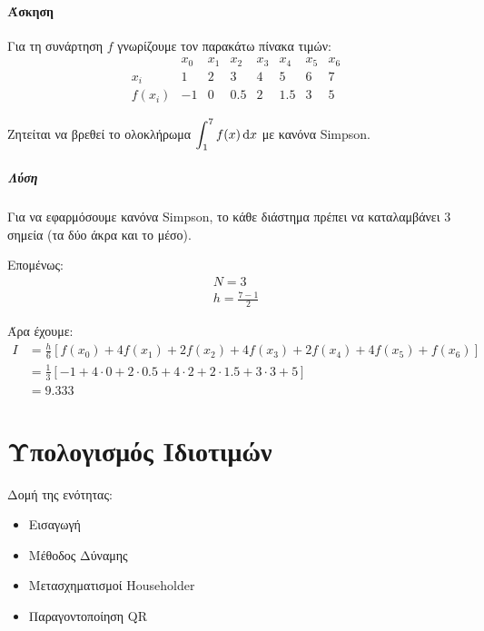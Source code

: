 \documentclass[11pt,a4paper,notitlepage,fleqn]{article}
\begin{document}
    \paragraph{Άσκηση}
    Για τη συνάρτηση \( f \) γνωρίζουμε τον παρακάτω πίνακα τιμών:
    \[
    \begin{array}{r|c|c|c|c|c|c|c}
    	       & x_0 & x_1 & x_2 & x_3 & x_4 & x_5 & x_6 \\[2ex]
    	   x_i &  1  &  2  &  3  &  4  &  5  &  6  &  7  \\ \hline
    	f(x_i) & -1  &  0  & 0.5 &  2  & 1.5 &  3  &  5
    \end{array}
    \]
    
    Ζητείται να βρεθεί το ολοκλήρωμα \( \displaystyle \int_1^7 f(x) 
    \mathop{}\!\mathrm{d} x \) με κανόνα Simpson.
    
    \subparagraph{Λύση}
    Για να εφαρμόσουμε κανόνα Simpson, το κάθε διάστημα πρέπει να
    καταλαμβάνει 3 σημεία (τα δύο άκρα και το μέσο).

    
    Επομένως:
    \begin{gather*}
    	N = 3 \\
    	h=\frac{7-1}{2}
    \end{gather*}
    
    Άρα έχουμε:
    \begin{align*}
    	I &= \frac{h}{6} \left[
    	f(x_0)+4f(x_1)+2f(x_2)+4f(x_3)+2f(x_4)+4f(x_5)+f(x_6)
    	\right] \\ &= \frac{1}{3} \left[
    	-1+4\cdot 0 + 2\cdot 0.5 + 4\cdot 2 + 2\cdot 1.5 + 3\cdot 3+5
    	\right] \\ &= 9.333
    \end{align*}
    
    \section{Υπολογισμός Ιδιοτιμών}
    Δομή της ενότητας:
    \begin{itemize}
    	\item Εισαγωγή
    	\item Μέθοδος Δύναμης
    	\item Μετασχηματισμοί Householder
    	\item Παραγοντοποίηση QR
    \end{itemize}
    
\end{document}
